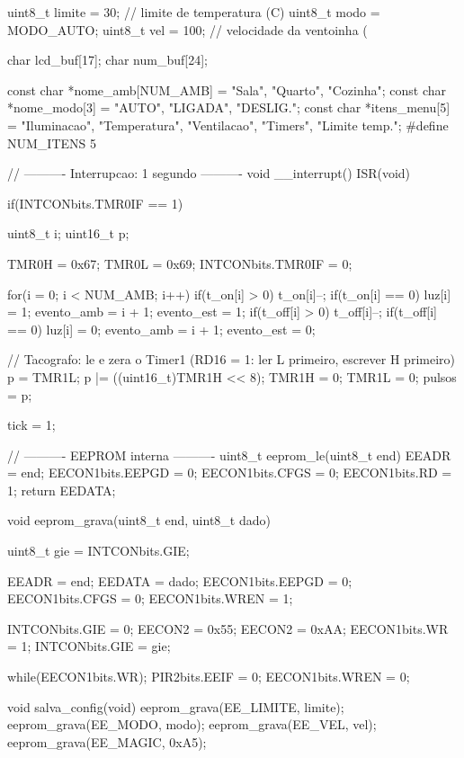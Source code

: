 uint8_t  limite = 30;                // limite de temperatura (C)
uint8_t  modo = MODO_AUTO;
uint8_t  vel = 100;                  // velocidade da ventoinha (%

char lcd_buf[17];
char num_buf[24];

const char *nome_amb[NUM_AMB] = {"Sala", "Quarto", "Cozinha"};
const char *nome_modo[3]      = {"AUTO", "LIGADA", "DESLIG."};
const char *itens_menu[5]     = {"Iluminacao", "Temperatura", "Ventilacao", "Timers", "Limite temp."};
#define NUM_ITENS 5

// ---------- Interrupcao: 1 segundo ----------
void __interrupt() ISR(void)
{
    if(INTCONbits.TMR0IF == 1)
    {
        uint8_t i;
        uint16_t p;

        TMR0H = 0x67;
        TMR0L = 0x69;
        INTCONbits.TMR0IF = 0;

        for(i = 0; i < NUM_AMB; i++)
        {
            if(t_on[i] > 0)
            {
                t_on[i]--;
                if(t_on[i] == 0)
                {
                    luz[i] = 1;
                    evento_amb = i + 1;
                    evento_est = 1;
                }
            }
            if(t_off[i] > 0)
            {
                t_off[i]--;
                if(t_off[i] == 0)
                {
                    luz[i] = 0;
                    evento_amb = i + 1;
                    evento_est = 0;
                }
            }
        }

        // Tacografo: le e zera o Timer1 (RD16 = 1: ler L primeiro, escrever H primeiro)
        p = TMR1L;
        p |= ((uint16_t)TMR1H << 8);
        TMR1H = 0;
        TMR1L = 0;
        pulsos = p;

        tick = 1;
    }
}

// ---------- EEPROM interna ----------
uint8_t eeprom_le(uint8_t end)
{
    EEADR = end;
    EECON1bits.EEPGD = 0;
    EECON1bits.CFGS = 0;
    EECON1bits.RD = 1;
    return EEDATA;
}

void eeprom_grava(uint8_t end, uint8_t dado)
{
    uint8_t gie = INTCONbits.GIE;

    EEADR = end;
    EEDATA = dado;
    EECON1bits.EEPGD = 0;
    EECON1bits.CFGS = 0;
    EECON1bits.WREN = 1;

    INTCONbits.GIE = 0;
    EECON2 = 0x55;
    EECON2 = 0xAA;
    EECON1bits.WR = 1;
    INTCONbits.GIE = gie;

    while(EECON1bits.WR);
    PIR2bits.EEIF = 0;
    EECON1bits.WREN = 0;
}

void salva_config(void)
{
    eeprom_grava(EE_LIMITE, limite);
    eeprom_grava(EE_MODO, modo);
    eeprom_grava(EE_VEL, vel);
    eeprom_grava(EE_MAGIC, 0xA5);
}

